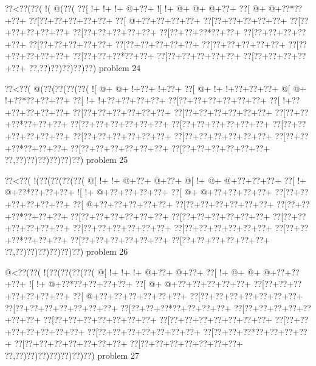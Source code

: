 \vbox{\vbox{\goo
\0??<\0??(\0??(\- !(\- @(\0??(
\0??[\- !+\- !+\- !+\- @+\0??+
\- ![\- !+\- @+\- @+\- @+\0??+
\0??[\- @+\- @+\0??*\0??+\0??+
\0??[\0??+\0??+\0??+\0??+\0??+
\0??[\- @+\0??+\0??+\0??+\0??+
\0??[\0??+\0??+\0??+\0??+\0??+
\0??[\0??+\0??+\0??+\0??+\0??+
\0??[\0??+\0??+\0??+\0??+\0??+
\0??[\0??+\0??+\0??*\0??+\0??+
\0??[\0??+\0??+\0??+\0??+\0??+
\0??[\0??+\0??+\0??+\0??+\0??+
\0??[\0??+\0??+\0??+\0??+\0??+
\0??[\0??+\0??+\0??+\0??+\0??+
\0??[\0??+\0??+\0??+\0??+\0??+
\0??[\0??+\0??+\0??*\0??+\0??+
\0??[\0??+\0??+\0??+\0??+\0??+
\0??[\0??+\0??+\0??+\0??+\0??+
\0??,\0??)\0??)\0??)\0??)\0??)
}
\hfil problem 24\hfil\break
}

\vbox{\vbox{\goo
\0??<\0??(\- @(\0??(\0??(\0??(\0??(
\- ![\- @+\- @+\- !+\0??+\- !+\0??+
\0??[\- @+\- !+\- !+\0??+\0??+\0??+
\- @[\- @+\- !+\0??*\0??+\0??+\0??+
\0??[\- !+\- !+\0??+\0??+\0??+\0??+
\0??[\0??+\0??+\0??+\0??+\0??+\0??+
\0??[\- !+\0??+\0??+\0??+\0??+\0??+
\0??[\0??+\0??+\0??+\0??+\0??+\0??+
\0??[\0??+\0??+\0??+\0??+\0??+\0??+
\0??[\0??+\0??+\0??*\0??+\0??+\0??+
\0??[\0??+\0??+\0??+\0??+\0??+\0??+
\0??[\0??+\0??+\0??+\0??+\0??+\0??+
\0??[\0??+\0??+\0??+\0??+\0??+\0??+
\0??[\0??+\0??+\0??+\0??+\0??+\0??+
\0??[\0??+\0??+\0??+\0??+\0??+\0??+
\0??[\0??+\0??+\0??*\0??+\0??+\0??+
\0??[\0??+\0??+\0??+\0??+\0??+\0??+
\0??[\0??+\0??+\0??+\0??+\0??+\0??+
\0??,\0??)\0??)\0??)\0??)\0??)\0??)
}
\hfil problem 25\hfil\break
}

\vbox{\vbox{\goo
\0??<\0??(\- !(\0??(\0??(\0??(\0??(
\- @[\- !+\- !+\- @+\0??+\- @+\0??+
\- @[\- !+\- @+\- @+\0??+\0??+\0??+
\0??[\- !+\- @+\0??*\0??+\0??+\0??+
\- ![\- !+\- @+\0??+\0??+\0??+\0??+
\0??[\- @+\- @+\0??+\0??+\0??+\0??+
\0??[\0??+\0??+\0??+\0??+\0??+\0??+
\0??[\- @+\0??+\0??+\0??+\0??+\0??+
\0??[\0??+\0??+\0??+\0??+\0??+\0??+
\0??[\0??+\0??+\0??*\0??+\0??+\0??+
\0??[\0??+\0??+\0??+\0??+\0??+\0??+
\0??[\0??+\0??+\0??+\0??+\0??+\0??+
\0??[\0??+\0??+\0??+\0??+\0??+\0??+
\0??[\0??+\0??+\0??+\0??+\0??+\0??+
\0??[\0??+\0??+\0??+\0??+\0??+\0??+
\0??[\0??+\0??+\0??*\0??+\0??+\0??+
\0??[\0??+\0??+\0??+\0??+\0??+\0??+
\0??[\0??+\0??+\0??+\0??+\0??+\0??+
\0??,\0??)\0??)\0??)\0??)\0??)\0??)
}
\hfil problem 26\hfil\break
}

\vbox{\vbox{\goo
\- @<\0??(\0??(\- !(\0??(\0??(\0??(\0??(
\- @[\- !+\- !+\- !+\- @+\0??+\- @+\0??+
\0??[\- !+\- @+\- @+\- @+\0??+\0??+\0??+
\- ![\- !+\- @+\0??*\0??+\0??+\0??+\0??+
\0??[\- @+\- @+\0??+\0??+\0??+\0??+\0??+
\0??[\0??+\0??+\0??+\0??+\0??+\0??+\0??+
\0??[\- @+\0??+\0??+\0??+\0??+\0??+\0??+
\0??[\0??+\0??+\0??+\0??+\0??+\0??+\0??+
\0??[\0??+\0??+\0??+\0??+\0??+\0??+\0??+
\0??[\0??+\0??+\0??*\0??+\0??+\0??+\0??+
\0??[\0??+\0??+\0??+\0??+\0??+\0??+\0??+
\0??[\0??+\0??+\0??+\0??+\0??+\0??+\0??+
\0??[\0??+\0??+\0??+\0??+\0??+\0??+\0??+
\0??[\0??+\0??+\0??+\0??+\0??+\0??+\0??+
\0??[\0??+\0??+\0??+\0??+\0??+\0??+\0??+
\0??[\0??+\0??+\0??*\0??+\0??+\0??+\0??+
\0??[\0??+\0??+\0??+\0??+\0??+\0??+\0??+
\0??[\0??+\0??+\0??+\0??+\0??+\0??+\0??+
\0??,\0??)\0??)\0??)\0??)\0??)\0??)\0??)
}
\hfil problem 27\hfil\break
}

